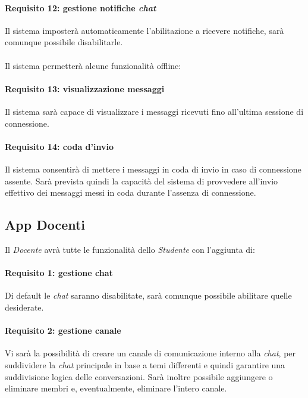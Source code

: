 \paragraph{Requisito 12: gestione notifiche \emph{chat}\\}
Il sistema imposterà automaticamente l’abilitazione a ricevere notifiche, sarà comunque possibile disabilitarle.\\
\\
Il sistema permetterà alcune funzionalità offline:

\paragraph{Requisito 13: visualizzazione messaggi\\}
Il sistema sarà capace di visualizzare i messaggi ricevuti fino all’ultima sessione di connessione.

\paragraph{Requisito 14: coda d'invio\\}
Il sistema consentirà di mettere i messaggi in coda di invio in caso di connessione assente. Sarà prevista quindi la capacità del sistema di provvedere all’invio effettivo dei messaggi messi in coda durante l’assenza di connessione.

\subsection{App Docenti}
Il \emph{Docente} avrà tutte le funzionalità dello \emph{Studente} con l’aggiunta di:

\paragraph{Requisito 1: gestione chat\\}
Di default le \emph{chat} saranno disabilitate, sarà comunque possibile abilitare quelle desiderate.

\paragraph{Requisito 2: gestione canale\\}
Vi sarà la possibilità di creare un canale di comunicazione interno alla \emph{chat}, per suddividere la \emph{chat} principale in base a temi differenti e quindi garantire una suddivisione logica delle conversazioni. Sarà inoltre possibile aggiungere o eliminare membri e, eventualmente, eliminare l’intero canale.


